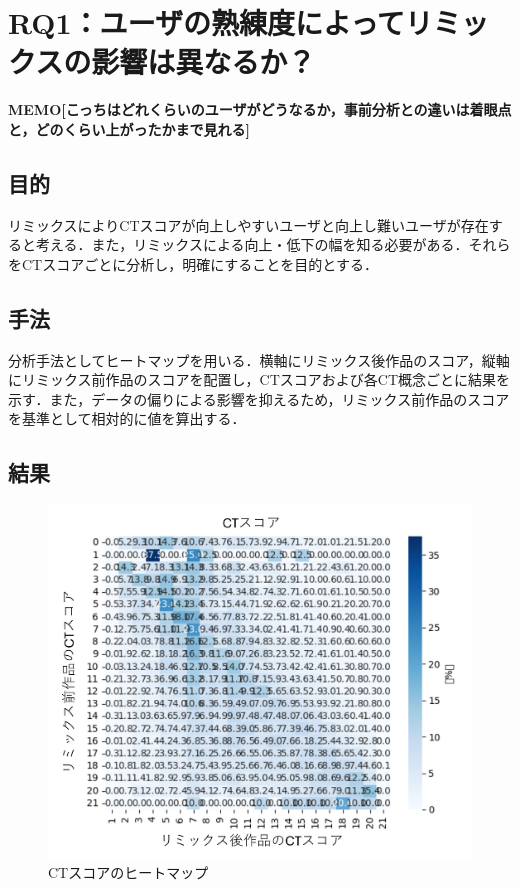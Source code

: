 \documentclass[submit,techrep,noauthor]{ipsj}
\newcommand{\memo}[1]{\colorbox{magenta!30}{\textbf{MEMO}}{\color{red!50}\textbf{[#1]}}}
\begin{document}
\section{RQ1：ユーザの熟練度によってリミックスの影響は異なるか？}
\label{sec:rq1}
\memo{こっちはどれくらいのユーザがどうなるか，事前分析との違いは着眼点と，どのくらい上がったかまで見れる}

\subsection{目的}
リミックスによりCTスコアが向上しやすいユーザと向上し難いユーザが存在すると考える．また，リミックスによる向上・低下の幅を知る必要がある．それらをCTスコアごとに分析し，明確にすることを目的とする．

\subsection{手法}

分析手法としてヒートマップを用いる．横軸にリミックス後作品のスコア，縦軸にリミックス前作品のスコアを配置し，CTスコアおよび各CT概念ごとに結果を示す．また，データの偏りによる影響を抑えるため，リミックス前作品のスコアを基準として相対的に値を算出する．

\subsection{結果}
\begin{figure}[h]
  \centering
  \includegraphics[width=\linewidth]{@IPSJ_SIGSE202511_Horio/fig/heatmapCT.pdf}
  \caption{CTスコアのヒートマップ}
  \label{heatmapCT}
\end{figure}
\end{document}

